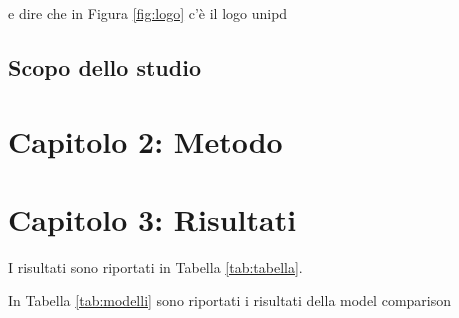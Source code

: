 \documentclass[
]{article}
\begin{document}
e dire che in Figura \ref{fig:logo} c'è il logo unipd

\hypertarget{scopo-dello-studio}{%
\subsection{Scopo dello studio}\label{scopo-dello-studio}}

\hypertarget{capitolo-2-metodo}{%
\section{Capitolo 2: Metodo}\label{capitolo-2-metodo}}

\hypertarget{capitolo-3-risultati}{%
\section{Capitolo 3: Risultati}\label{capitolo-3-risultati}}

I risultati sono riportati in Tabella \ref{tab:tabella}.

\begin{table}[ht]
\centering
\caption{Tabella dei risultati} 
\label{tab:tabella}
\end{table}

In Tabella \ref{tab:modelli} sono riportati i risultati della model
comparison
\end{document}
